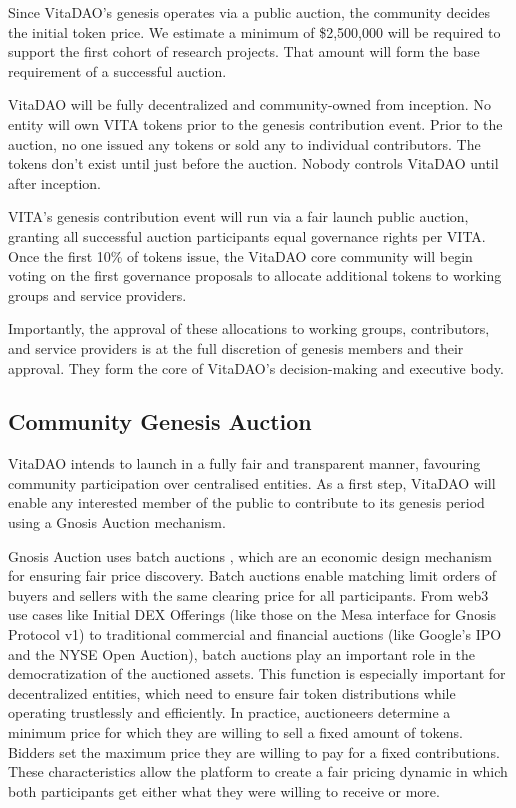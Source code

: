\documentclass[10pt,letterpaper]{article}
\begin{document}
Since VitaDAO's genesis operates via a public auction, the community decides the initial token price. We estimate a minimum of \$2,500,000 will be required to support the first cohort of research projects. That amount will form the base requirement of a successful auction.

VitaDAO will be fully decentralized and community-owned from inception. No entity will own VITA tokens prior to the genesis contribution event. Prior to the auction, no one issued any tokens or sold any to individual contributors. The tokens don't exist until just before the auction. Nobody controls VitaDAO until after inception.

VITA’s genesis contribution event will run via a fair launch public auction, granting all successful auction participants equal governance rights per VITA. Once the first 10\% of tokens issue, the VitaDAO core community will begin voting on the first governance proposals to allocate additional tokens to working groups and service providers.

Importantly, the approval of these allocations to working groups, contributors, and service providers is at the full discretion of genesis members and their approval. They form the core of VitaDAO's decision-making and executive body.

\subsection{Community Genesis Auction}
VitaDAO intends to launch in a fully fair and transparent manner, favouring community participation over centralised entities. As a first step, VitaDAO will enable any interested member of the public to contribute to its genesis period using a Gnosis Auction mechanism.

Gnosis Auction uses batch auctions \citep{BatchAuctions}, which are an economic design mechanism for ensuring fair price discovery. Batch auctions enable matching limit orders of buyers and sellers with the same clearing price for all participants. From web3 use cases like Initial DEX Offerings (like those on the Mesa interface for Gnosis Protocol v1) to traditional commercial and financial auctions (like Google’s IPO and the NYSE Open Auction), batch auctions play an important role in the democratization of the auctioned assets. This function is especially important for decentralized entities, which need to ensure fair token distributions while operating trustlessly and efficiently.  In practice, auctioneers determine a minimum price for which they are willing to sell a fixed amount of tokens. Bidders set the maximum price they are willing to pay for a fixed contributions. These characteristics allow the platform to create a fair pricing dynamic in which both participants get either what they were willing to receive or more.
\end{document}
